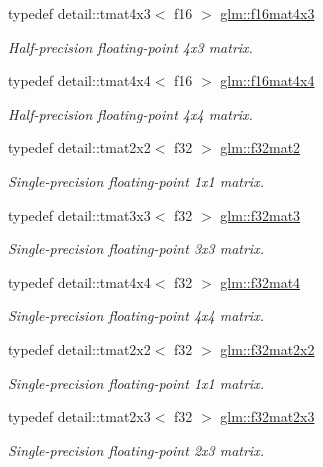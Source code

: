 \begin{DoxyCompactItemize}
typedef detail\-::tmat4x3$<$ f16 $>$ \hyperlink{group__gtc__type__precision_gaa0c9c69c19bf90bb73e455a1e61f7114}{glm\-::f16mat4x3}
\begin{DoxyCompactList}\small\item\em Half-\/precision floating-\/point 4x3 matrix. \end{DoxyCompactList}\item 
typedef detail\-::tmat4x4$<$ f16 $>$ \hyperlink{group__gtc__type__precision_gaf9b9286a90e95701746631e00c08697a}{glm\-::f16mat4x4}
\begin{DoxyCompactList}\small\item\em Half-\/precision floating-\/point 4x4 matrix. \end{DoxyCompactList}\item 
typedef detail\-::tmat2x2$<$ f32 $>$ \hyperlink{group__gtc__type__precision_ga82ecea513745584fb481d18fc9fa5e0a}{glm\-::f32mat2}
\begin{DoxyCompactList}\small\item\em Single-\/precision floating-\/point 1x1 matrix. \end{DoxyCompactList}\item 
typedef detail\-::tmat3x3$<$ f32 $>$ \hyperlink{group__gtc__type__precision_gadc036a0da6d6b14996ece8884896a0e6}{glm\-::f32mat3}
\begin{DoxyCompactList}\small\item\em Single-\/precision floating-\/point 3x3 matrix. \end{DoxyCompactList}\item 
typedef detail\-::tmat4x4$<$ f32 $>$ \hyperlink{group__gtc__type__precision_gaf7b538eba9a2dd812c39ac7145e7cd93}{glm\-::f32mat4}
\begin{DoxyCompactList}\small\item\em Single-\/precision floating-\/point 4x4 matrix. \end{DoxyCompactList}\item 
typedef detail\-::tmat2x2$<$ f32 $>$ \hyperlink{group__gtc__type__precision_ga0cd7f055e4070140afba92b7fbff1e04}{glm\-::f32mat2x2}
\begin{DoxyCompactList}\small\item\em Single-\/precision floating-\/point 1x1 matrix. \end{DoxyCompactList}\item 
typedef detail\-::tmat2x3$<$ f32 $>$ \hyperlink{group__gtc__type__precision_gae5592c8cdb8c7d7985d06af7d774e261}{glm\-::f32mat2x3}
\begin{DoxyCompactList}\small\item\em Single-\/precision floating-\/point 2x3 matrix. \end{DoxyCompactList}\item 

\end{DoxyCompactItemize}
